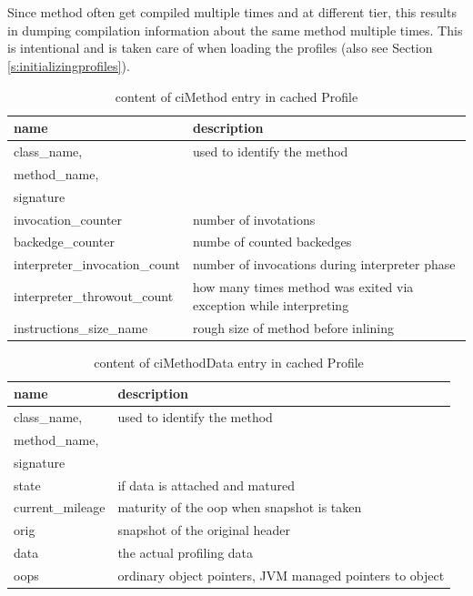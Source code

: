 \\\\
Since method often get compiled multiple times and at different tier, this results in dumping compilation information about the same method multiple times. This is intentional and is taken care of when loading the profiles (also see Section \ref{s:initializingprofiles}).
\begin{table}[ht!]
  \caption{content of ciMethod entry in cached Profile}
  \label{t:cimethod}
  \begin{center}
    \begin{tabular}{|p{5cm}|p{10.5cm}|} 
      \hline
       \textbf{name} & \textbf{description} \\ \hline\hline
       class\_name,& used to identify the method\\
       method\_name, & \\
       signature & \\ \hline
       invocation\_counter & number of invotations\\ \hline
       backedge\_counter & numbe of counted backedges\\ \hline
       interpreter\_invocation\_count & number of invocations during interpreter phase\\ \hline
       interpreter\_throwout\_count & how many times method was exited via exception while interpreting\\ \hline
       instructions\_size\_name & rough size of method before inlining\\ \hline
    \end{tabular}
  \end{center}
\end{table}
\begin{table}[ht!]
  \caption{content of ciMethodData entry in cached Profile}
  \label{t:cimethoddata}
  \begin{center}
    \begin{tabular}{|p{5cm}|p{10.5cm}|} 
      \hline
       \textbf{name} & \textbf{description} \\ \hline\hline
       class\_name,& used to identify the method\\
       method\_name, & \\
       signature & \\ \hline
       state & if data is attached and matured\\ \hline
       current\_mileage & maturity of the oop when snapshot is taken\\ \hline
       orig &  snapshot of the original header\\ \hline
       data & the actual profiling data\\ \hline
       oops & ordinary object pointers, JVM managed pointers to object\\ \hline        
    \end{tabular}
  \end{center}
\end{table}
